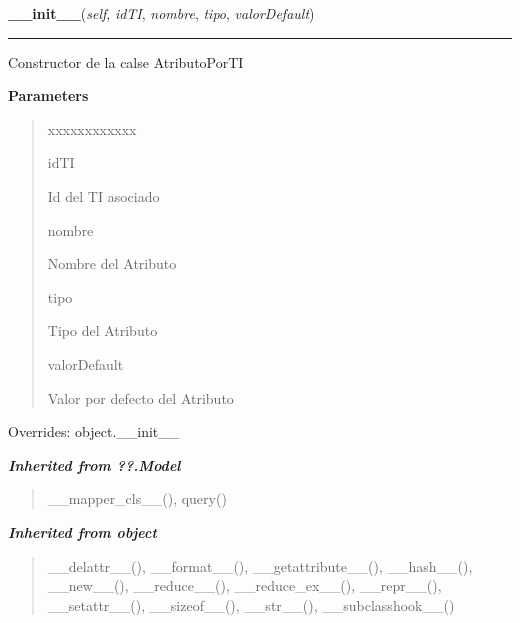 \hspace{.8\funcindent}\begin{boxedminipage}{\funcwidth}

    \raggedright \textbf{\_\_init\_\_}(\textit{self}, \textit{idTI}, \textit{nombre}, \textit{tipo}, \textit{valorDefault})

    \vspace{-1.5ex}

    \rule{\textwidth}{0.5\fboxrule}
\setlength{\parskip}{2ex}
    Constructor de la calse AtributoPorTI

\setlength{\parskip}{1ex}
      \textbf{Parameters}
      \vspace{-1ex}

      \begin{quote}
        \begin{Ventry}{xxxxxxxxxxxx}

          \item[idTI]

          Id del TI asociado

          \item[nombre]

          Nombre del Atributo

          \item[tipo]

          Tipo del Atributo

          \item[valorDefault]

          Valor por defecto del Atributo

        \end{Ventry}

      \end{quote}

      Overrides: object.\_\_init\_\_

    \end{boxedminipage}


\large{\textbf{\textit{Inherited from ??.Model}}}

\begin{quote}
\_\_mapper\_cls\_\_(), query()
\end{quote}

\large{\textbf{\textit{Inherited from object}}}

\begin{quote}
\_\_delattr\_\_(), \_\_format\_\_(), \_\_getattribute\_\_(), \_\_hash\_\_(), \_\_new\_\_(), \_\_reduce\_\_(), \_\_reduce\_ex\_\_(), \_\_repr\_\_(), \_\_setattr\_\_(), \_\_sizeof\_\_(), \_\_str\_\_(), \_\_subclasshook\_\_()
\end{quote}

